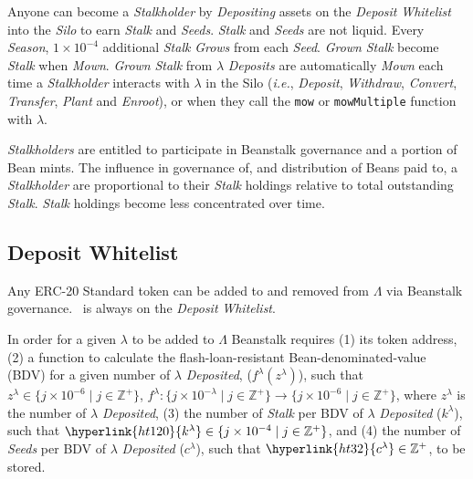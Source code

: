 \documentclass[tikz]{article}
\newcommand{\code}[1]{\texttt{#1}}
\newcommand{\term}[1]{\textsl{#1}}
\newcommand{\Bean}{} %
\begin{document}
Anyone can become a \term{Stalkholder} by \term{Depositing} assets on the \term{Deposit} \term{Whitelist} into the \term{Silo} to earn \term{Stalk} and \term{Seeds}. \term{Stalk} and \term{Seeds} are not liquid. Every \term{Season}, $1 \times 10^{-4}$ additional \term{Stalk} \term{Grows} from each \term{Seed}. \term{Grown} \term{Stalk} become \term{Stalk} when \term{Mown}. \term{Grown} \term{Stalk} from \hyperlink{ht126}{$\lambda$} \term{Deposits} are automatically \term{Mown} each time a \term{Stalkholder} interacts with \hyperlink{ht126}{$\lambda$} in the Silo (\term{i.e.}, \term{Deposit}, \term{Withdraw}, \term{Convert}, \term{Transfer}, \term{Plant} and \term{Enroot}), or when they call the \code{mow} or \code{mowMultiple} function with \hyperlink{ht126}{$\lambda$}.

\term{Stalkholders} are entitled to participate in Beanstalk governance and a portion of Bean mints. The influence in governance of, and distribution of Beans paid to, a \term{Stalkholder} are proportional to their \term{Stalk} holdings relative to total outstanding \term{Stalk}. \term{Stalk} holdings become less concentrated over time.

\vspace*{-1mm}
\subsection{Deposit Whitelist}
\vspace*{-1mm}
Any ERC-20 Standard token can be added to and removed from \hyperlink{ht127}{$\Lambda$} via Beanstalk governance. \Bean\ is always on the \term{Deposit} \term{Whitelist}.

In order for a given \hyperlink{ht126}{$\lambda$} to be added to \hyperlink{ht127}{$\Lambda$} Beanstalk requires (1) its token address, (2) a function to calculate the flash-loan-resistant Bean-denominated-value (BDV) for a given number of \hyperlink{ht126}{$\lambda$} \term{Deposited}, (\hyperlink{ht84}{$f^{\lambda}(z^{\lambda})$}), such that $z^{\lambda} \in \{j \times 10^{-6} \mid j \in \mathbb{Z}^{+} \}$, $f^{\lambda}\colon \{j \times 10^{-\lambda} \mid j \in \mathbb{Z}^{+} \} \rightarrow \{j \times 10^{-6} \mid j \in \mathbb{Z}^{+} \}$, where $z^{\lambda}$ is the number of \hyperlink{ht126}{$\lambda$} \term{Deposited}, (3) the number of \term{Stalk} per BDV of \hyperlink{ht126}{$\lambda$} \term{Deposited} (\hyperlink{ht120}{$k^{\lambda}$}), such that $\hyperlink{ht120}{k^{\lambda}} \in \{j \times 10^{-4} \mid j \in \mathbb{Z}^{+} \}$, and (4) the number of \term{Seeds} per BDV of \hyperlink{ht126}{$\lambda$} \term{Deposited} (\hyperlink{ht32}{$c^{\lambda}$}), such that $\hyperlink{ht32}{c^{\lambda}} \in \mathbb{Z}^{+}$, to be stored.
\end{document}
